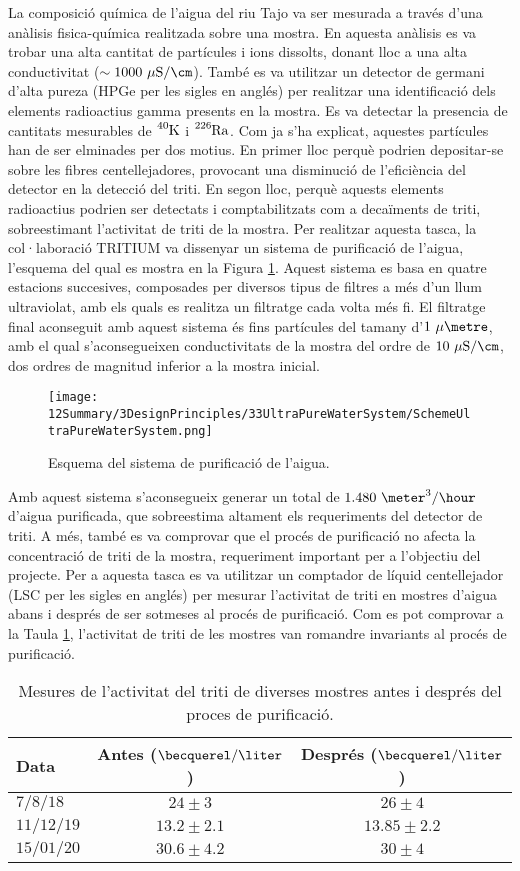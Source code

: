 La composició química de l'aigua del riu Tajo va ser mesurada a través d'una anàlisis fisica-química realitzada sobre una mostra. En aquesta anàlisis es va trobar una alta cantitat de partícules i ions dissolts, donant lloc a una alta conductivitat ($\sim 1000~\mu\text{S}/\cm$). També es va utilitzar un detector de germani d'alta pureza (HPGe per les sigles en anglés) per realitzar una identificació dels elements radioactius gamma presents en la mostra. Es va detectar la presencia de cantitats mesurables de $\ce{^{40}K}$ i $\ce{^{226}Ra}$. Com ja s'ha explicat, aquestes partícules han de ser elminades per dos motius. En primer lloc perquè podrien depositar-se sobre les fibres centellejadores, provocant una disminució de l'eficiència del detector en la detecció del triti. En segon lloc, perquè aquests elements radioactius podrien ser detectats i comptabilitzats com a decaïments de triti, sobreestimant l'activitat de triti de la mostra. Per realitzar aquesta tasca, la col·laboració TRITIUM va dissenyar un sistema de purificació de l'aigua, l'esquema del qual es mostra en la Figura \ref{fig:EsquemaSistemaAiguaUltrapura}. Aquest sistema es basa en quatre estacions succesives, composades per diversos tipus de filtres a més d'un llum ultraviolat, amb els quals es realitza un filtratge cada volta més fi. El filtratge final aconseguit amb aquest sistema és fins partícules del tamany d'$1~\mu\metre$, amb el qual s'aconsegueixen conductivitats de la mostra del ordre de $10~\mu\text{S}/\cm$, dos ordres de magnitud inferior a la mostra inicial.
\begin{figure}[htbp]
\centering
\texttt{[image: 12Summary/3DesignPrinciples/33UltraPureWaterSystem/SchemeUltraPureWaterSystem.png]}
\caption{Esquema del sistema de purificació de l'aigua.\label{fig:EsquemaSistemaAiguaUltrapura}}
\end{figure}
Amb aquest sistema s'aconsegueix generar un total de $1.480~\meter^3/\hour$ d'aigua purificada, que sobreestima altament els requeriments del detector de triti. A més, també es va comprovar que el procés de purificació no afecta la concentració de triti de la mostra, requeriment important per a l'objectiu del projecte. Per a aquesta tasca es va utilitzar un comptador de líquid centellejador (LSC per les sigles en anglés) per mesurar l'activitat de triti en mostres d'aigua abans i després de ser sotmeses al procés de purificació. Com es pot comprovar a la Taula \ref{tab:ValorsActivitatTriti}, l'activitat de triti de les mostres van romandre invariants al procés de purificació.

\begin{table}[htbp]
\centering{}%
\begin{tabular}{lcc}
\toprule 
Data & Antes ($\becquerel/\liter$) & Després ($\becquerel/\liter$) \tabularnewline
\midrule
\midrule 
$7/8/18$ & $24 \pm 3$ & $26 \pm 4$ \tabularnewline
$11/12/19$ & $13.2 \pm 2.1$ & $13.85 \pm 2.2$ \tabularnewline
$15/01/20$ & $30.6 \pm 4.2$ & $30 \pm 4$ \tabularnewline
\bottomrule
\end{tabular}
\caption{Mesures de l'activitat del triti de diverses mostres antes i després del proces de purificació.}
\label{tab:ValorsActivitatTriti}
\end{table}

